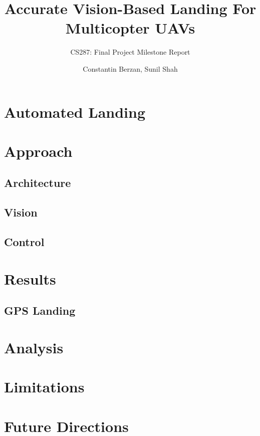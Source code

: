 \documentclass[10pt, twocolumn]{scrartcl} %
\title{Accurate Vision-Based Landing For Multicopter UAVs}
\subtitle{CS287: Final Project Milestone Report}
\author{Constantin Berzan, Sunil Shah}
\date{}
\begin{document}
\maketitle

\begin{abstract}
\end{abstract}
\section{Automated Landing}


\section{Approach}

\subsection{Architecture}

\subsection{Vision}

\subsection{Control}


\section{Results}

\subsection{GPS Landing}

\section{Analysis}

\section{Limitations}

\section{Future Directions}
\end{document}

